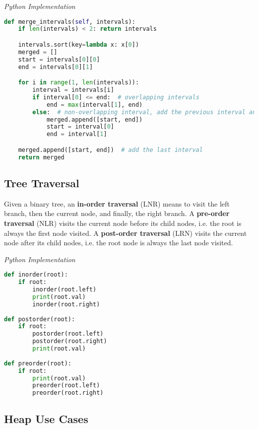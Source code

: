 \documentclass{article}
\begin{document}
\vspace{8pt} \emph{Python Implementation}
\begin{lstlisting}[language=Python]
def merge_intervals(self, intervals):
    if len(intervals) < 2: return intervals

    intervals.sort(key=lambda x: x[0])
    merged = []
    start = intervals[0][0]
    end = intervals[0][1]

    for i in range(1, len(intervals)):
        interval = intervals[i]
        if interval[0] <= end:  # overlapping intervals
            end = max(interval[1], end)
        else:  # non-overlapping interval, add the previous interval and reset
            merged.append([start, end])
            start = interval[0]
            end = interval[1]

    merged.append([start, end])  # add the last interval
    return merged
\end{lstlisting}
    
    \subsection{Tree Traversal}
    Given a binary tree, an \textbf{in-order traversal} (LNR) means to visit the left branch, then the current node, and finally, the right branch. A \textbf{pre-order traversal} (NLR) visits the current node before its child nodes, i.e. the root is always the first node visited. A \textbf{post-order traversal} (LRN) visits the current node after its child nodes, i.e. the root node is always the last node visited.

\vspace{8pt} \emph{Python Implementation}
\begin{lstlisting}[language=Python]  
def inorder(root): 
    if root: 
        inorder(root.left) 
        print(root.val)
        inorder(root.right) 
  
def postorder(root): 
    if root: 
        postorder(root.left) 
        postorder(root.right) 
        print(root.val)
        
def preorder(root): 
    if root: 
        print(root.val)
        preorder(root.left) 
        preorder(root.right) 
\end{lstlisting}
 
    \subsection{Heap Use Cases}
\end{document}
